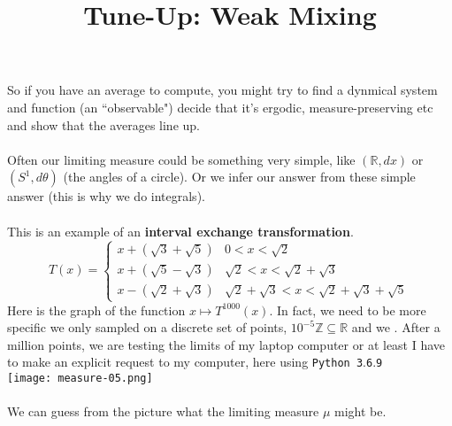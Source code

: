 \documentclass[12pt]{article}
\title{Tune-Up: Weak Mixing}
\date{}
\begin{document}
\sffamily

\maketitle

{\fontsize{16pt}{16pt}\selectfont 

\noindent 

\noindent So if you have an average to compute, you might try to find a dynmical system and function (an ``observable") decide that it's ergodic, measure-preserving etc and show that the averages line up. \\ \\
Often our limiting measure could be something very simple, like $(\mathbb{R}, dx)$ or $(S^1, d\theta)$ (the angles of a circle). Or we infer our answer from these simple answer (this is why we do integrals). \\ \\
This is an example of an \textbf{interval exchange transformation}. 
$$ T(x) = \left\{ 
\begin{array}{c|c} 
x + (\sqrt{3} + \sqrt{5}) & 0 < x < \sqrt{2}\quad \; \; \, \\
x + (\sqrt{5} - \sqrt{3}) & \sqrt{2} < x < \sqrt{2} + \sqrt{3}\\
x - (\sqrt{2} + \sqrt{3}) & \sqrt{2} + \sqrt{3} < x < \sqrt{2} + \sqrt{3} + \sqrt{5} \end{array} \right. $$
Here is the graph of the function $x \mapsto T^{1000}(x)$. In fact, we need to be more specific we only sampled on a discrete set of points, $10^{-5}\mathbb{Z} \subseteq \mathbb{R}$ and we .  After a million points, we are testing the limits of my laptop computer or at least I have to make an explicit request to my computer, here using {\color{yellow!50!black}\texttt{Python 3}}.{\color{yellow!50!black}\texttt{6}}.{\color{yellow!50!black}\texttt{9}} \\ 
\texttt{[image: measure-05.png]} \\ \\
We can guess from the picture what the limiting measure $\mu$ might be.

\newpage 

}
\end{document}
